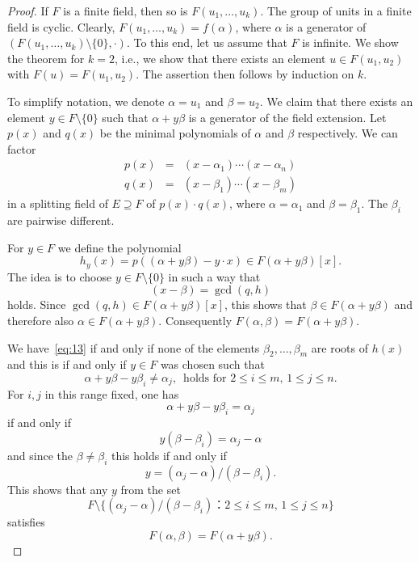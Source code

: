\begin{proof}
  If $F$ is a finite field, then so is  $F(u_1,\dots,u_k)$. The group of units  in a finite field is cyclic. Clearly, $F(u_1,\dots,u_k) = f(α)$, where $α$ is a generator of $(F(u_1,\dots,u_k) \setminus \{0\}, ⋅)$. To this end, let us assume that $F$ is infinite. We show the theorem  for $k=2$, i.e., we show that there exists an element $u ∈ F(u_1,u_2)$ with $F(u) = F(u_1,u_2)$. The assertion  then  follows by induction on $k$.

 


To simplify notation, we denote  $α = u_1$ and $β = u_2$. We claim that there exists an element $y ∈F \setminus \{0\}$ such that $α + yβ$ is a generator of the field extension.  Let $p(x)$ and $q(x)$ be the minimal polynomials of $α$ and $β$ respectively. We can factor
  \begin{eqnarray*}
    p(x) & = &  (x- α_1) \cdots (x-α_n)  \\
    q(x) & = & (x- β_1) \cdots (x-β_m) 
  \end{eqnarray*}
  in a splitting field of $E ⊇ F$ of $p(x)⋅q(x)$, where $α=α_1$ and $β = β_1$. The $β_i$ are pairwise different.

  For $y ∈ F$ we  define the polynomial
  \begin{equation}
    \label{eq:12}
    h_y(x) = p( (α + y β) - y ⋅ x) ∈ F(α + y β)[x]. 
  \end{equation}
  The idea is to choose $y ∈F \setminus \{0\}$ in such a way that
  \begin{equation}
    \label{eq:13}
    (x-β) =  \gcd(q,h) 
  \end{equation}
  holds.  Since $\gcd(q,h) ∈ F(α + y β)[x]$, this shows that
  $β ∈ F(α + y β)$ and therefore also $α ∈ F(α + y β)$. Consequently
  $F(α,β) = F(α + y β)$.

  We have~\eqref{eq:13} if and only if none of the elements $β_2,\dots,β_m$ are roots of $h(x)$ and this is if and only if $y ∈ F$ was chosen such that
  \begin{equation}
    \label{eq:14}
    α + y β - y β_i ≠ α_j, \, \text{ holds for } 2≤ i ≤ m, \, 1 ≤ j ≤ n.  
  \end{equation}
  For $i,j$ in this range fixed, one has
  \begin{displaymath}
     α + y β - y β_i = α_j 
   \end{displaymath}
   if and only if
   \begin{displaymath}
     y (β - β_i) = α_j - α 
   \end{displaymath}
   and since the $β≠ β_i$ this holds if and only if
   \begin{displaymath}
     y  = (α_j - α)  / (β - β_i). 
   \end{displaymath}
   This shows that any $y$ from the set
   \begin{displaymath}
     F \setminus \{ (α_j - α)  / (β - β_i) ：  2≤ i ≤ m, \, 1 ≤ j ≤ n\}
   \end{displaymath}
   satisfies
   \begin{displaymath}
     F(α,β) = F(α + y β). 
   \end{displaymath}  
\end{proof}



